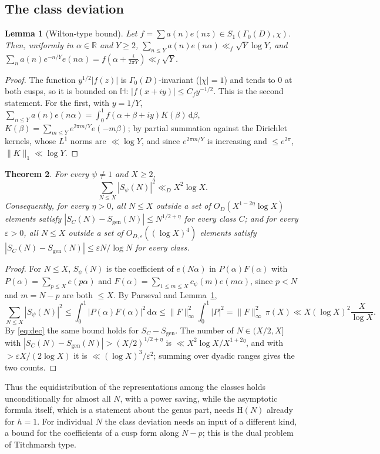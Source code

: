 ﻿\documentclass[11pt]{amsart}
\newtheorem{theorem}{Theorem}[section]
\newtheorem{lemma}[theorem]{Lemma}
\theoremstyle{remark}
\newcommand{\HH}{\mathbb H}
\newcommand{\dd}{\,\mathrm d}
\newcommand{\gen}{\mathrm{gen}}
\newcommand{\e}{\varepsilon}
\begin{document}
\subsection{The class deviation}
\begin{lemma}[Wilton-type bound]\label{lem:wilton}
Let $f=\sum a(n)e(nz)\in S_1(\Gamma_0(D),\chi)$. Then, uniformly in $\alpha\in\mathbb R$ and $Y\ge2$, $\sum_{n\le Y}a(n)e(n\alpha)\ll_f\sqrt Y\log Y$, and $\sum_na(n)e^{-n/Y}e(n\alpha)=f(\alpha+\frac i{2\pi Y})\ll_f\sqrt Y$.
\end{lemma}
\begin{proof}
The function $y^{1/2}|f(z)|$ is $\Gamma_0(D)$-invariant ($|\chi|=1$) and tends to $0$ at both cusps, so it is bounded on $\HH$: $|f(x+iy)|\le C_fy^{-1/2}$. This is the second statement. For the first, with $y=1/Y$, $\sum_{n\le Y}a(n)e(n\alpha)=\int_0^1f(\alpha+\beta+iy)K(\beta)\dd\beta$, $K(\beta)=\sum_{m\le Y}e^{2\pi m/Y}e(-m\beta)$; by partial summation against the Dirichlet kernels, whose $L^1$ norms are $\ll\log Y$, and since $e^{2\pi m/Y}$ is increasing and $\le e^{2\pi}$, $\|K\|_1\ll\log Y$.
\end{proof}

\begin{theorem}\label{thm:almostall}
For every $\psi\ne1$ and $X\ge2$,
\[
\sum_{N\le X}|S_\psi(N)|^2\ll_DX^2\log X .
\]
Consequently, for every $\eta>0$, all $N\le X$ outside a set of $O_D(X^{1-2\eta}\log X)$ elements satisfy $|S_C(N)-S_\gen(N)|\le N^{1/2+\eta}$ for every class $C$; and for every $\e>0$, all $N\le X$ outside a set of $O_{D,\e}((\log X)^4)$ elements satisfy $|S_C(N)-S_\gen(N)|\le\e N/\log N$ for every class.
\end{theorem}
\begin{proof}
For $N\le X$, $S_\psi(N)$ is the coefficient of $e(N\alpha)$ in $P(\alpha)F(\alpha)$ with $P(\alpha)=\sum_{p\le X}e(p\alpha)$ and $F(\alpha)=\sum_{1\le m\le X}c_\psi(m)e(m\alpha)$, since $p<N$ and $m=N-p$ are both $\le X$. By Parseval and Lemma~\ref{lem:wilton},
\[
\sum_{N\le X}|S_\psi(N)|^2\le\int_0^1|P(\alpha)F(\alpha)|^2\dd\alpha\le\|F\|_\infty^2\int_0^1|P|^2=\|F\|^2_\infty\,\pi(X)\ll X(\log X)^2\frac X{\log X}.
\]
By \eqref{eq:dec} the same bound holds for $S_C-S_\gen$. The number of $N\in(X/2,X]$ with $|S_C(N)-S_\gen(N)|>(X/2)^{1/2+\eta}$ is $\ll X^2\log X/X^{1+2\eta}$, and with $>\e X/(2\log X)$ it is $\ll(\log X)^3/\e^2$; summing over dyadic ranges gives the two counts.
\end{proof}

Thus the equidistribution of the representations among the classes holds unconditionally for almost all $N$, with a power saving, while the asymptotic formula itself, which is a statement about the genus part, needs $\mathrm H(N)$ already for $h=1$. For individual $N$ the class deviation needs an input of a different kind, a bound for the coefficients of a cusp form along $N-p$; this is the dual problem of Titchmarsh type.
\end{document}
